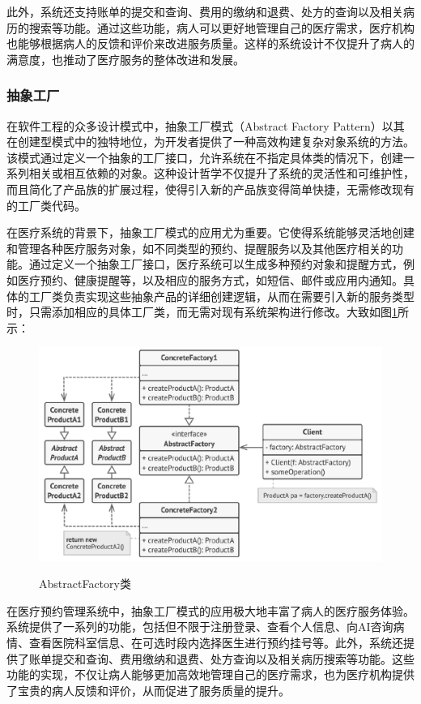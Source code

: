 此外，系统还支持账单的提交和查询、费用的缴纳和退费、处方的查询以及相关病历的搜索等功能。通过这些功能，病人可以更好地管理自己的医疗需求，医疗机构也能够根据病人的反馈和评价来改进服务质量。这样的系统设计不仅提升了病人的满意度，也推动了医疗服务的整体改进和发展。


\subsubsection{抽象工厂}

在软件工程的众多设计模式中，抽象工厂模式（Abstract Factory Pattern）以其在创建型模式中的独特地位，为开发者提供了一种高效构建复杂对象系统的方法。该模式通过定义一个抽象的工厂接口，允许系统在不指定具体类的情况下，创建一系列相关或相互依赖的对象。这种设计哲学不仅提升了系统的灵活性和可维护性，而且简化了产品族的扩展过程，使得引入新的产品族变得简单快捷，无需修改现有的工厂类代码。

在医疗系统的背景下，抽象工厂模式的应用尤为重要。它使得系统能够灵活地创建和管理各种医疗服务对象，如不同类型的预约、提醒服务以及其他医疗相关的功能。通过定义一个抽象工厂接口，医疗系统可以生成多种预约对象和提醒方式，例如医疗预约、健康提醒等，以及相应的服务方式，如短信、邮件或应用内通知。具体的工厂类负责实现这些抽象产品的详细创建逻辑，从而在需要引入新的服务类型时，只需添加相应的具体工厂类，而无需对现有系统架构进行修改。大致如图\ref{app02}所示：
\begin{figure}[htbp]
	\centering
	\includegraphics[width=0.6\textheight]{figures/02.png}\label{app02}
	\caption{AbstractFactory类}
\end{figure}

在医疗预约管理系统中，抽象工厂模式的应用极大地丰富了病人的医疗服务体验。系统提供了一系列的功能，包括但不限于注册登录、查看个人信息、向AI咨询病情、查看医院科室信息、在可选时段内选择医生进行预约挂号等。此外，系统还提供了账单提交和查询、费用缴纳和退费、处方查询以及相关病历搜索等功能。这些功能的实现，不仅让病人能够更加高效地管理自己的医疗需求，也为医疗机构提供了宝贵的病人反馈和评价，从而促进了服务质量的提升。

